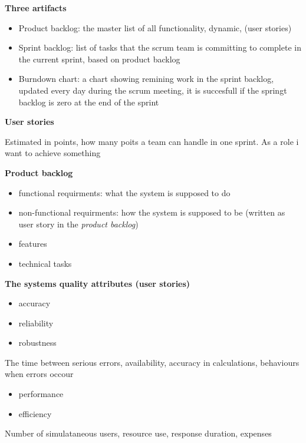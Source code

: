 \documentclass{article}
\begin{document}
\begin{flushleft}
    \textbf{Three artifacts}\par
    \begin{itemize}
        \item Product backlog: the master list of all functionality, dynamic, (user stories)
        \item Sprint backlog: list of tasks that the scrum team is committing to complete in the current sprint, based on product backlog
        \item Burndown chart: a chart showing remining work in the sprint backlog, updated every day during the scrum meeting, it is succesfull if the springt backlog is zero at the end of the sprint
    \end{itemize}

    \textbf{User stories}\par 
    Estimated in points, how many poits a team can handle in one sprint. 
    As a role i want to achieve something \par
    \bigskip
    \textbf{Product backlog}
    \begin{itemize}
        \item functional requirments: what the system is supposed to do
        \item non-functional requirments: how the system is supposed to be (written as user story in the \emph{product backlog})
        \item features
        \item technical tasks
    \end{itemize}



    \textbf{The systems quality attributes (user stories)}\par 

    \begin{itemize}
        \item accuracy
        \item reliability
        \item robustness
    \end{itemize}
    The time between serious errors, availability, accuracy in calculations, behaviours when errors occour

    \begin{itemize}
        \item performance
        \item efficiency
    \end{itemize}
    Number of simulataneous users, resource use, response duration, expenses


\end{flushleft}
\end{document}
